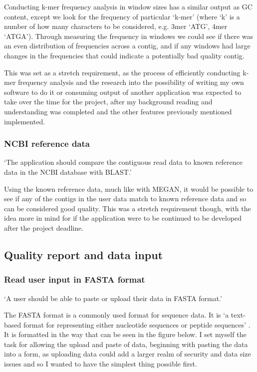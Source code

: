 Conducting k-mer frequency analysis in window sizes has a similar output as GC content, except we look for the frequency of particular `k-mer' (where `k' is a number of how many characters to be considered, e.g. 3mer `ATG', 4mer `ATGA'). Through measuring the frequency in windows we could see if there was an even distribution of frequencies across a contig, and if any windows had large changes in the frequencies that could indicate a potentially bad quality contig.\cite{citeulike:12566531}

This was set as a stretch requirement, as the process of efficiently conducting k-mer frequency analysis and the research into the possibility of writing my own software to do it or consuming output of another application was expected to take over the time for the project, after my background reading and understanding was completed and the other features previously mentioned implemented.

\subsubsection{NCBI reference data}
`The application should compare the contiguous read data to known reference data in the NCBI database with BLAST.'

Using the known reference data, much like with MEGAN, it would be possible to see if any of the contigs in the user data match to known reference data and so can be considered good quality. This was a stretch requirement though, with the idea more in mind for if the application were to be continued to be developed after the project deadline.

\subsection{Quality report and data input}
\subsubsection{Read user input in FASTA format}
`A user should be able to paste or upload their data in FASTA format.'

The FASTA format is a commonly used format for sequence data. It is `a text-based format for representing either nucleotide sequences or peptide sequences' \cite{fastaformat}. It is formatted in the way that can be seen in the figure below. I set myself the task for allowing the upload and paste of data, beginning with pasting the data into a form, as uploading data could add a larger realm of security and data size issues and so I wanted to have the simplest thing possible first.

